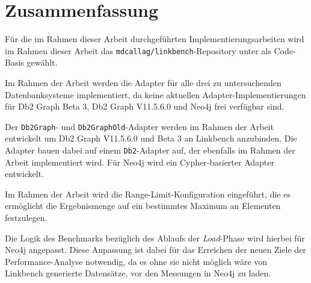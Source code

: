\section{Zusammenfassung}
\label{implementierung:zusammenfassung}
Für die im Rahmen dieser Arbeit durchgeführten Implementierungsarbeiten wird im Rahmen dieser Arbeit das \texttt{mdcallag/linkbench}-Repository unter \cite{mc_linkbench_github} als Code-Basis gewählt.

Im Rahmen der Arbeit werden die Adapter für alle drei zu untersuchenden Datenbanksysteme implementiert, da keine aktuellen Adapter-Implementierungen für Db2 Graph Beta 3, Db2 Graph V11.5.6.0 und Neo4j frei verfügbar sind.

Der \texttt{Db2Graph}- und \texttt{Db2GraphOld}-Adapter werden im Rahmen der Arbeit entwickelt um Db2 Graph V11.5.6.0 und Beta 3 an Linkbench anzubinden. Die Adapter bauen dabei auf einem \texttt{Db2}-Adapter auf, der ebenfalls im Rahmen der Arbeit implementiert wird. Für Neo4j wird ein Cypher-basierter Adapter entwickelt. 

Im Rahmen der Arbeit wird die Range-Limit-Konfiguration eingeführt, die es ermöglicht die Ergebnismenge auf ein bestimmtes Maximum an Elementen festzulegen. 

Die Logik des Benchmarks bezüglich des Ablaufs der \textit{Load}-Phase wird hierbei für Neo4j angepasst. Diese Anpassung ist dabei für das Erreichen der neuen Ziele der Performance-Analyse notwendig, da es ohne sie nicht möglich wäre von Linkbench generierte Datensätze, vor den Messungen in Neo4j zu laden. 
